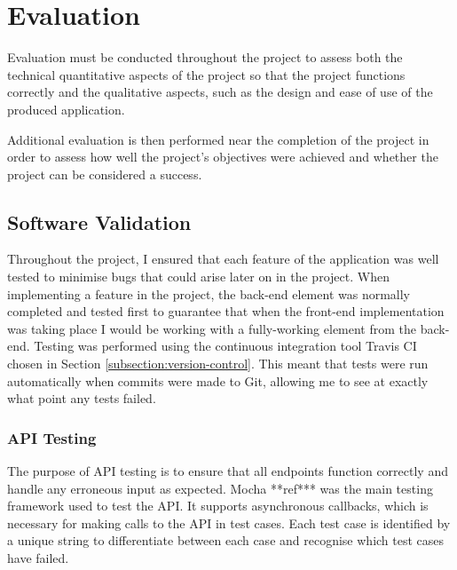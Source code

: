 \chapter{Evaluation}

Evaluation must be conducted throughout the project to assess both the technical quantitative aspects of the project so that the project functions correctly and the qualitative aspects, such as the design and ease of use of the produced application.

Additional evaluation is then performed near the completion of the project in order to assess how well the project's objectives were achieved and whether the project can be considered a success.

%

\section{Software Validation}

Throughout the project, I ensured that each feature of the application was well tested to minimise bugs that could arise later on in the project. When implementing a feature in the project, the back-end element was normally completed and tested first to guarantee that when the front-end implementation was taking place I would be working with a fully-working element from the back-end. Testing was performed using the continuous integration tool Travis CI chosen in Section \ref{subsection:version-control}. This meant that tests were run automatically when commits were made to Git, allowing me to see at exactly what point any tests failed.

\subsection{API Testing}

The purpose of API testing is to ensure that all endpoints function correctly and handle any erroneous input as expected. Mocha **ref*** was the main testing framework used to test the API. It supports asynchronous callbacks, which is necessary for making calls to the API in test cases. Each test case is identified by a unique string to differentiate between each case and recognise which test cases have failed.

